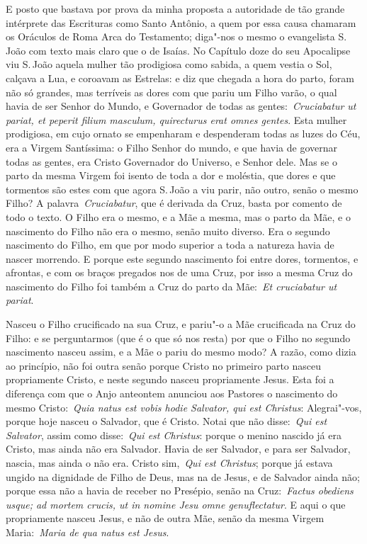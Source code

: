 E posto que bastava por prova da minha proposta a autoridade
de tão grande intérprete das Escrituras como Santo Antônio, a quem por
essa causa chamaram os Oráculos de Roma Arca do Testamento; diga"-nos o
mesmo o evangelista S.\,João com texto mais claro que o de Isaías. No
Capítulo doze do seu Apocalipse viu S.\,João aquela mulher tão prodigiosa
como sabida, a quem vestia o Sol, calçava a Lua, e coroavam as Estrelas:
e diz que chegada a hora do parto, foram não só grandes, mas terríveis
as dores com que pariu um Filho varão, o qual havia de ser Senhor do
Mundo, e Governador de todas as gentes:~\emph{Cruciabatur ut pariat, et
peperit filium masculum, quirecturus erat omnes
gentes}. Esta mulher prodigiosa, em cujo ornato se
empenharam e despenderam todas as luzes do Céu, era a Virgem Santíssima:
o Filho Senhor do mundo, e que havia de governar todas as gentes, era
Cristo Governador do Universo, e Senhor dele. Mas se o parto da mesma
Virgem foi isento de toda a dor e moléstia, que dores e que tormentos
são estes com que agora S.\,João a viu parir, não outro, senão o mesmo
Filho? A palavra~\emph{Cruciabatur}, que é derivada da Cruz, basta por
comento de todo o texto. O Filho era o mesmo, e a Mãe a mesma, mas o
parto da Mãe, e o nascimento do Filho não era o mesmo, senão muito
diverso. Era o segundo nascimento do Filho, em que por modo superior a
toda a natureza havia de nascer morrendo. E porque este segundo
nascimento foi entre dores, tormentos, e afrontas, e com os braços
pregados nos de uma Cruz, por isso a mesma Cruz do nascimento do Filho
foi também a Cruz do parto da Mãe:~\emph{Et cruciabatur ut pariat}.


Nasceu o Filho crucificado na sua Cruz, e pariu"-o a Mãe
crucificada na Cruz do Filho: e se perguntarmos (que é o que só nos
resta) por que o Filho no segundo nascimento nasceu assim, e a Mãe o
pariu do mesmo modo? A razão, como dizia ao princípio, não foi outra
senão porque Cristo no primeiro parto nasceu propriamente Cristo, e
neste segundo nasceu propriamente Jesus. Esta foi a diferença com que o
Anjo anteontem anunciou aos Pastores o nascimento do mesmo
Cristo:~\emph{Quia natus est vobis hodie Salvator, qui est
Christus}: Alegrai"-vos, porque hoje nasceu o Salvador,
que é Cristo. Notai que não disse:~\emph{Qui est Salvator}, assim como
disse:~\emph{Qui est Christus}: porque o menino nascido já era Cristo,
mas ainda não era Salvador. Havia de ser Salvador, e para ser Salvador,
nascia, mas ainda o não era. Cristo sim,~\emph{Qui est Christus}; porque
já estava ungido na dignidade de Filho de Deus, mas na de Jesus, e de
Salvador ainda não; porque essa não a havia de receber no Presépio,
senão na Cruz:~\emph{Factus obediens usque; ad mortem crucis, ut in
nomine Jesu omne genuflectatur}. E aqui o que propriamente nasceu Jesus,
e não de outra Mãe, senão da mesma Virgem Maria:~\emph{Maria de qua
natus est Jesus}.


